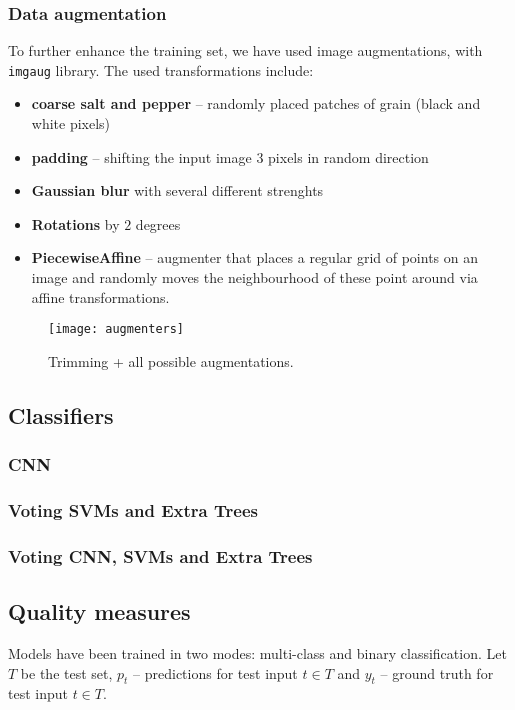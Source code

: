         \subsubsection*{Data augmentation}
        To further enhance the training set, we have used image augmentations, with \texttt{imgaug}\cite{imgaug} library.
        The used transformations include:
        \begin{itemize}
            \item \textbf{coarse salt and pepper} -- randomly placed patches of grain (black and white pixels)
            \item \textbf{padding} -- shifting the input image $3$ pixels in random direction
            \item \textbf{Gaussian blur} with several different strenghts
            \item \textbf{Rotations} by $2$ degrees
            \item \textbf{PiecewiseAffine} -- augmenter that places a regular grid of points on an image and randomly moves the neighbourhood of these point around via affine transformations.
        \end{itemize}
        \begin{figure}[H]
        \caption{Trimming + all possible augmentations.}
        \centering
        \texttt{[image: augmenters]}
        \end{figure}

    \subsection{Classifiers}
        \subsubsection*{CNN}

        \subsubsection*{Voting SVMs and Extra Trees}

        \subsubsection*{Voting CNN, SVMs and Extra Trees}

    \subsection{Quality measures}
        Models have been trained in two modes: multi-class and binary
        classification. Let $T$ be the test set, $p_t$ -- predictions for test input
        $t \in T$ and $y_t$ -- ground truth for test input $t \in T$.
